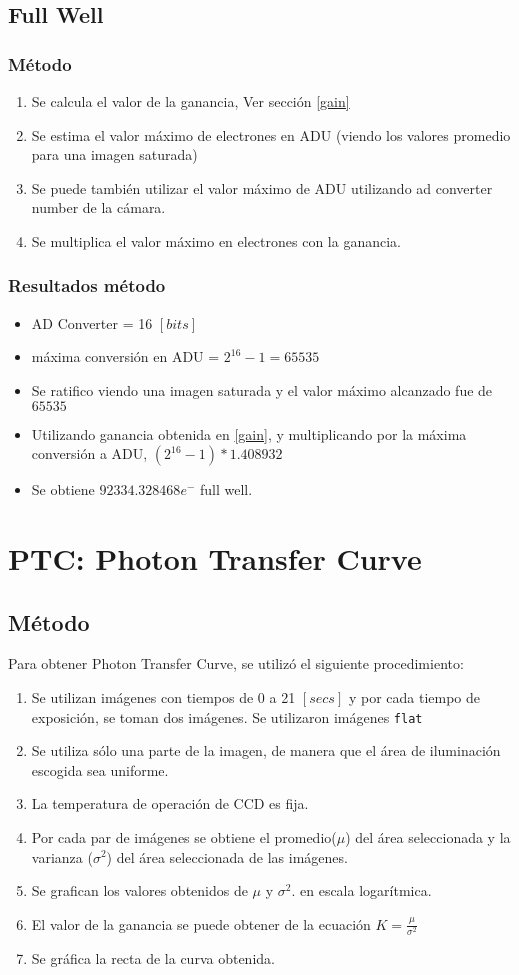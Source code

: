 \documentclass[a4paper,10pt]{article}
\begin{document}
\subsection{Full Well}
\subsubsection{Método}
\begin{enumerate}
\item Se calcula el valor de la ganancia, Ver sección \ref{gain}
\item Se estima el valor máximo de electrones en ADU (viendo los valores promedio para una imagen saturada)
\item Se puede también utilizar el valor máximo de ADU utilizando ad converter number de la cámara.
\item Se multiplica el valor máximo en electrones con la ganancia.
\end{enumerate}
\subsubsection{Resultados método}
\begin{itemize}
\item AD Converter = 16 $[bits]$
\item máxima conversión en ADU  = $2^{16} - 1 = 65535$
\item Se ratifico viendo una imagen saturada y el valor máximo alcanzado fue de  $65535$
\item Utilizando ganancia obtenida en \ref{gain}, y multiplicando por la máxima conversión a ADU, $(2^{16} - 1)*1.408932$
\item Se obtiene $92334.328468e^-$ full well.
\end{itemize}
\section{PTC: Photon Transfer Curve}
\label{PTC}
\subsection{Método}
Para obtener Photon Transfer Curve, se utilizó el siguiente procedimiento:
\begin{enumerate}
\item Se utilizan imágenes con tiempos de 0 a 21 $[secs]$ y por cada tiempo de exposición, se toman dos imágenes. Se utilizaron imágenes {\tt flat}
\item Se utiliza sólo una parte de la imagen, de manera que el área de iluminación escogida sea uniforme.
\item La temperatura de operación de CCD es fija.
\item Por cada par de imágenes se obtiene el promedio($\mu$) del área seleccionada y la varianza ($\sigma^2$) del área seleccionada de las imágenes.
\item Se grafican los valores obtenidos de $\mu$ y $\sigma^2$. en escala logarítmica.
\item El valor de la ganancia se puede obtener de la ecuación $K = \frac{\mu}{\sigma^2}$
\item Se gráfica la recta de la curva obtenida. 
\end{enumerate}
\end{document}
